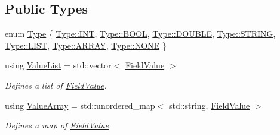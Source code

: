 \subsection*{Public Types}
\begin{DoxyCompactItemize}
\item 
enum \mbox{\hyperlink{classZiApi_1_1FieldValue_ab1c22868954a17fa7a1f486d91830dd7}{Type}} \{ \newline
\mbox{\hyperlink{classZiApi_1_1FieldValue_ab1c22868954a17fa7a1f486d91830dd7a53f93baa3057821107c750323892fa92}{Type\+::\+I\+NT}}, 
\mbox{\hyperlink{classZiApi_1_1FieldValue_ab1c22868954a17fa7a1f486d91830dd7aa97b2c144243b2b9d2c593ec268b62f5}{Type\+::\+B\+O\+OL}}, 
\mbox{\hyperlink{classZiApi_1_1FieldValue_ab1c22868954a17fa7a1f486d91830dd7afd3e4ece78a7d422280d5ed379482229}{Type\+::\+D\+O\+U\+B\+LE}}, 
\mbox{\hyperlink{classZiApi_1_1FieldValue_ab1c22868954a17fa7a1f486d91830dd7a63b588d5559f64f89a416e656880b949}{Type\+::\+S\+T\+R\+I\+NG}}, 
\newline
\mbox{\hyperlink{classZiApi_1_1FieldValue_ab1c22868954a17fa7a1f486d91830dd7a298cb25408234de02baf2085803a464a}{Type\+::\+L\+I\+ST}}, 
\mbox{\hyperlink{classZiApi_1_1FieldValue_ab1c22868954a17fa7a1f486d91830dd7acb4fb1757fb37c43cded35d3eb857c43}{Type\+::\+A\+R\+R\+AY}}, 
\mbox{\hyperlink{classZiApi_1_1FieldValue_ab1c22868954a17fa7a1f486d91830dd7ab50339a10e1de285ac99d4c3990b8693}{Type\+::\+N\+O\+NE}}
 \}
\item 
\mbox{\label{classZiApi_1_1FieldValue_a80ee7fc5fc9c95e80ef61929b277c5e5}} 
using \mbox{\hyperlink{classZiApi_1_1FieldValue_a80ee7fc5fc9c95e80ef61929b277c5e5}{Value\+List}} = std\+::vector$<$ \mbox{\hyperlink{classZiApi_1_1FieldValue}{Field\+Value}} $>$
\begin{DoxyCompactList}\small\item\em Defines a list of \mbox{\hyperlink{classZiApi_1_1FieldValue}{Field\+Value}}. \end{DoxyCompactList}\item 
\mbox{\label{classZiApi_1_1FieldValue_a879443efd90b1669535916854847a239}} 
using \mbox{\hyperlink{classZiApi_1_1FieldValue_a879443efd90b1669535916854847a239}{Value\+Array}} = std\+::unordered\+\_\+map$<$ std\+::string, \mbox{\hyperlink{classZiApi_1_1FieldValue}{Field\+Value}} $>$
\begin{DoxyCompactList}\small\item\em Defines a map of \mbox{\hyperlink{classZiApi_1_1FieldValue}{Field\+Value}}. \end{DoxyCompactList}\end{DoxyCompactItemize}
